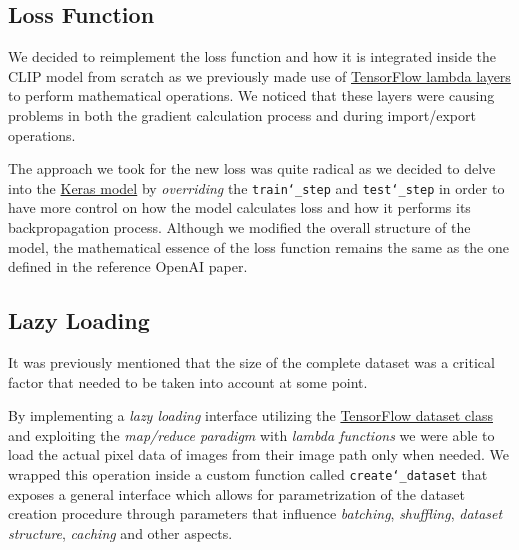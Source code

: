 \documentclass[10pt,twocolumn,letterpaper]{article}
\begin{document}
\subsection{Loss Function}
We decided to reimplement the loss function and how it is integrated inside the CLIP model from scratch as we previously made use of \href{https://www.tensorflow.org/api_docs/python/tf/keras/layers/Lambda}{TensorFlow lambda layers} to perform mathematical operations.
We noticed that these layers were causing problems in both the gradient calculation process and during import/export operations.

The approach we took for the new loss was quite radical as we decided to delve into the \href{https://www.tensorflow.org/api_docs/python/tf/keras/Model}{Keras model} by \textit{overriding} the \texttt{train\char`_step} and \texttt{test\char`_step} in order to have more control on how the model calculates loss and how it performs its backpropagation process.
Although we modified the overall structure of the model, the mathematical essence of the loss function remains the same as the one defined in the reference OpenAI paper.

\subsection{Lazy Loading}
It was previously mentioned that the size of the complete dataset was a critical factor that needed to be taken into account at some point.

By implementing a \textit{lazy loading} interface utilizing the \href{https://www.tensorflow.org/api_docs/python/tf/data/Dataset}{TensorFlow dataset class} and exploiting the \textit{map/reduce paradigm} with \textit{lambda functions} we were able to load the actual pixel data of images from their image path only when needed.
We wrapped this operation inside a custom function called \texttt{create\char`_dataset} that exposes a general interface which allows for parametrization of the dataset creation procedure through parameters that influence \textit{batching}, \textit{shuffling}, \textit{dataset structure}, \textit{caching} and other aspects.

\end{document}
